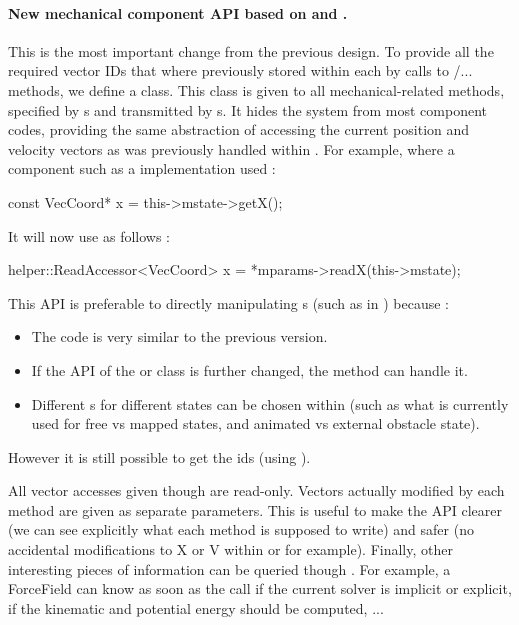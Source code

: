 \begin{itemize}
\begin{itemize}
\paragraph{New mechanical component API based on  and .}
This is the most important change from the previous design.
To provide all the required vector IDs that where previously stored within each  by calls to /... methods, we define a  class.
This class is given to all mechanical-related methods, specified by s and transmitted by s.
It hides the  system from most component codes, providing the same abstraction of accessing the current position and velocity vectors as was previously handled within . For example, where a component such as a  implementation used :
\begin{code_cpp}
const VecCoord* x = this->mstate->getX();
\end{code_cpp}
It will now use  as follows :
\begin{code_cpp}
helper::ReadAccessor<VecCoord> x = *mparams->readX(this->mstate);
\end{code_cpp}

This API is preferable to directly manipulating s (such as in ) because :
\begin{itemize}
\item The code is very similar to the previous version.
\item If the API of the  or  class is further changed, the  method can handle it.
\item Different s for different states can be chosen within  (such as what is currently used for free vs mapped states, and animated vs external obstacle state).
\end{itemize}

However it is still possible to get the ids (using ).

All vector accesses given though  are read-only.
Vectors actually modified by each method are given as separate  parameters.
This is useful to make the API clearer (we can see explicitly what each method is supposed to write) and safer (no accidental modifications to X or V within  or  for example).
Finally, other interesting pieces of information can be queried though .
For example, a ForceField can know as soon as the  call if the current solver is implicit or explicit, if the kinematic and potential energy should be computed, ...


\end{itemize}
\end{itemize}
